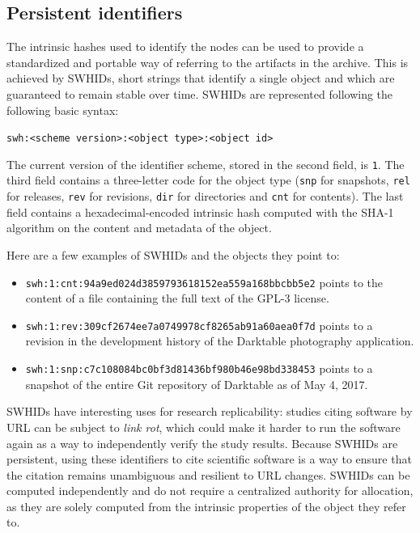 \subsection{Persistent identifiers}
\label{sec:swhid}

The intrinsic hashes used to identify the nodes can be used to provide a
standardized and portable way of referring to the artifacts in the archive. This
is achieved by \glspl{SWHID}, short strings that identify a single object
and which are guaranteed to remain stable over time.
\glspl{SWHID} are represented following the following basic syntax:

\texttt{swh:<scheme version>:<object type>:<object id>}

The current version of the identifier scheme, stored in the second field, is
\texttt{1}. The third field contains a three-letter code for the object type
(\texttt{snp} for snapshots, \texttt{rel} for releases, \texttt{rev} for
revisions, \texttt{dir} for directories and \texttt{cnt} for contents). The
last field contains a hexadecimal-encoded intrinsic hash computed with the
SHA-1 algorithm on the content and metadata of the object.

Here are a few examples of \glspl{SWHID} and the objects they point to:

\begin{itemize}
    \setlength\itemsep{0em}
    \item \texttt{swh:1:cnt:94a9ed024d3859793618152ea559a168bbcbb5e2} points to
        the content of a file containing the full text of the GPL-3 license.
    \item \texttt{swh:1:rev:309cf2674ee7a0749978cf8265ab91a60aea0f7d} points to
        a revision in the development history of the Darktable photography
        application.
    \item \texttt{swh:1:snp:c7c108084bc0bf3d81436bf980b46e98bd338453} points to
        a snapshot of the entire Git repository of Darktable as of May 4, 2017.
\end{itemize}

\glspl{SWHID} have interesting uses for research replicability: studies
citing software by URL can be subject to \emph{link rot}, which could make it
harder to run the software again as a way to independently verify the study
results. Because \glspl{SWHID} are persistent, using these identifiers to cite
scientific software is a way to ensure that the citation remains unambiguous
and resilient to URL changes. \glspl{SWHID} can be computed independently and
do not require a centralized authority for allocation, as they are solely
computed from the intrinsic properties of the object they refer to.

